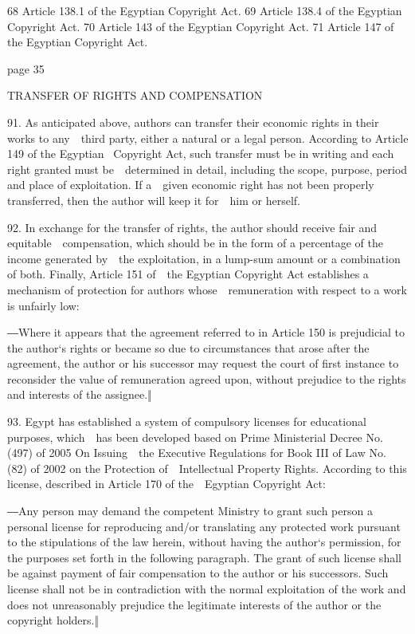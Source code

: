 \documentclass[
]{article}
\begin{document}
{68 }{Article 138.1 of the Egyptian }{Copyright Act. }{69 }{Article
138.4 of the Egyptian }{Copyright Act. }{70 }{Article 143 of the
Egyptian }{Copyright Act. }{71 }{Article 147 of the Egyptian }{Copyright
Act.}

{page 35}

{TRANSFER OF RIGHTS AND COMPENSATION}

{91. }{As anticipated above, authors can transfer their economic rights
in their works to any~~third party, either a natural or a legal person.
According to Article 149 of the Egyptian }{~Copyright Act}{, such
transfer must be in writing and each right granted must be~~determined
in detail, including the scope, purpose, period and place of
exploitation. If a~~given economic right has not been properly
transferred, then the author will keep it for~~him or herself.}

{92. }{In exchange for the transfer of rights, the author should receive
fair and equitable~~compensation, which should be in the form of a
percentage of the income generated by~~the exploitation, in a lump-sum
amount or a combination of both. Finally, Article 151 of~~the Egyptian
}{Copyright Act }{establishes a mechanism of protection for authors
whose~~remuneration with respect to a work is unfairly low:}

{―Where it appears that the agreement referred to i}{n Article 150 is
prejudicial to }{the author`s rights or became so due to circumstances
that arose after the }{agreement, the author or his successor may
request the court of first instance to reconsider the value of
remuneration agreed upon, without prejudice to the }{rights and
interests of the assignee.‖}

{93. }{Egypt has established a system of compulsory licenses for
educational purposes, which~~has been developed based on }{Prime
Ministerial Decree No. (497) of 2005 On Issuing~~the Executive
Regulations for Book III of Law No. (82) of 2002 on the Protection
of~~Intellectual Property Rights}{. According to this license, described
in Article 170 of the~~Egyptian }{Copyright Act}{:}

{―Any person may demand the competent Ministry to grant such person a
}{personal license for reproducing and/or translating any protected work
}{pursuant to the stipulations of the law herein, without having the
author`s }{permission, for the purposes set forth in the following
paragraph. The grant of such license shall be against payment of fair
compensation to the author or his successors. Such license shall not be
in contradiction with the normal exploitation of the work and does not
unreasonably prejudice the legitimate }{interests of the author or the
copyright holders.‖}
\end{document}
